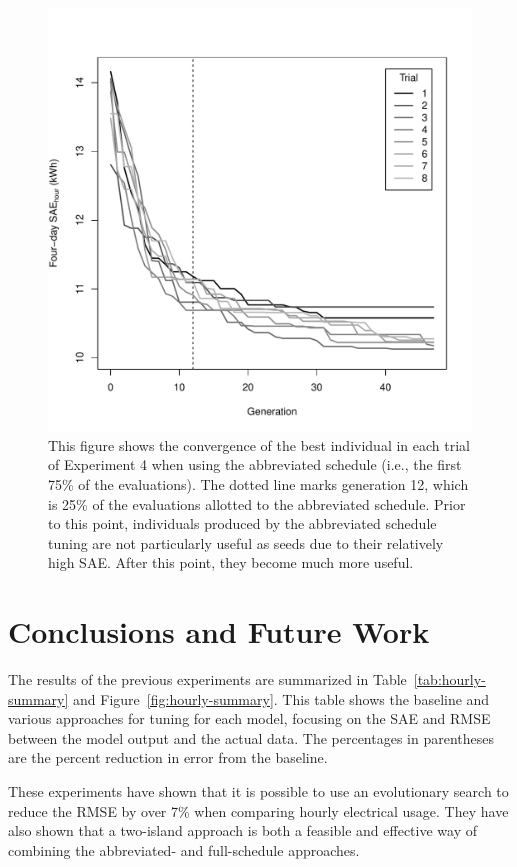\documentclass[preprint, review, 12pt]{elsarticle}
\begin{document}
\begin{figure}[tbp]
\centering
\includegraphics[width=5in]{figure2}
\caption{This figure shows the convergence of the best individual in each trial of Experiment 4 when using the abbreviated schedule (i.e., the first 75\% of the evaluations). The dotted line marks generation 12, which is 25\% of the evaluations allotted to the abbreviated schedule. Prior to this point, individuals produced by the abbreviated schedule tuning are not particularly useful as seeds due to their relatively high SAE. After this point, they become much more useful.}
\label{fig:hour-converge}
\end{figure}


\section{Conclusions and Future Work}
\label{sec:conclusions}
The results of the previous experiments are summarized in Table~\ref{tab:hourly-summary} and Figure~\ref{fig:hourly-summary}. This table shows the baseline and various approaches for tuning for each model, focusing on the SAE and RMSE between the model output and the actual data. The percentages in parentheses are the percent reduction in error from the baseline.

These experiments have shown that it is possible to use an evolutionary search to reduce the RMSE by over 7\% when comparing hourly electrical usage. They have also shown that a two-island approach is both a feasible and effective way of combining the abbreviated- and full-schedule approaches. 
\end{document}
